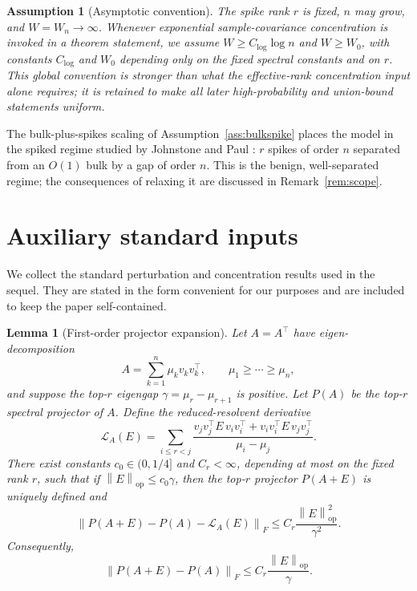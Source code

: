 \documentclass[11pt]{article}
\theoremstyle{tightplain}
\newtheorem{lemma}[theorem]{Lemma}
\theoremstyle{tightdef}
\newtheorem{assumption}[theorem]{Assumption}
\DeclareMathOperator{\op}{op}
\newcommand{\norm}[1]{\left\lVert #1 \right\rVert}
\begin{document}
\begin{assumption}[Asymptotic convention]\label{ass:asymptotic}
The spike rank $r$ is fixed, $n$ may grow, and $W=W_n\to\infty$. Whenever
exponential sample-covariance concentration is invoked in a theorem statement,
we assume $W\ge C_{\log}\log n$ and $W\ge W_0$, with constants $C_{\log}$ and $W_0$ depending only on the fixed
spectral constants and on $r$. This global convention is stronger than
what the effective-rank concentration input alone requires; it is retained to
make all later high-probability and union-bound statements uniform.
\end{assumption}

The bulk-plus-spikes scaling of Assumption~\ref{ass:bulkspike} places the model
in the spiked regime studied by Johnstone \cite{Johnstone2001} and Paul
\cite{Paul2007}: $r$ spikes of order $n$ separated from an $O(1)$ bulk by a gap
of order $n$. This is the benign, well-separated regime; the consequences of
relaxing it are discussed in Remark~\ref{rem:scope}.

\section{Auxiliary standard inputs}\label{sec:aux}

We collect the standard perturbation and concentration results used in the
sequel. They are stated in the form convenient for our purposes and are
included to keep the paper self-contained.

\begin{lemma}[First-order projector expansion]\label{lem:projectorexpansion}
Let $A=A^\top$ have eigen-decomposition
\[
A=\sum_{k=1}^n \mu_k v_kv_k^\top,
\qquad
\mu_1\ge\cdots\ge\mu_n,
\]
and suppose the top-$r$ eigengap $\gamma=\mu_r-\mu_{r+1}$ is positive. Let
$P(A)$ be the top-$r$ spectral projector of $A$. Define the reduced-resolvent
derivative
\[
\mathcal L_A(E)
=\sum_{i\le r<j}
\frac{v_j v_j^\top E\, v_i v_i^\top+v_i v_i^\top E\, v_j v_j^\top}{\mu_i-\mu_j}.
\]
There exist constants $c_0\in(0,1/4]$ and $C_r<\infty$, depending at most on the
fixed rank $r$, such that if $\norm{E}_{\op}\le c_0\gamma$, then the top-$r$
projector $P(A+E)$ is uniquely defined and
\[
\norm{P(A+E)-P(A)-\mathcal L_A(E)}_F
\le
C_r\frac{\norm{E}_{\op}^2}{\gamma^2}.
\]
Consequently,
\[
\norm{P(A+E)-P(A)}_F
\le
C_r\frac{\norm{E}_{\op}}{\gamma}.
\]
\end{lemma}
\end{document}
